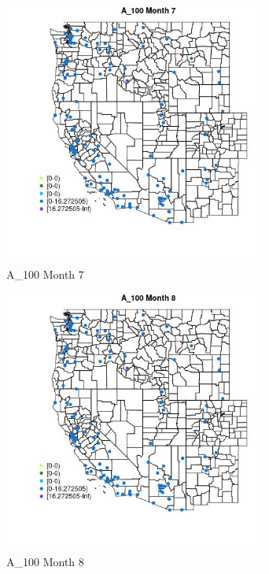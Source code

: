 \begin{figure} 
\centering  
\includegraphics[width=0.77\textwidth]{Code_Outputs/Report_ML_input_PM25_Step4_part_e_de_duplicated_aves_MapObsMo7A_100.jpg} 
\caption{\label{fig:Report_ML_input_PM25_Step4_part_e_de_duplicated_avesMapObsMo7A_100}A_100 Month 7} 
\end{figure} 
 

\clearpage 

\begin{figure} 
\centering  
\includegraphics[width=0.77\textwidth]{Code_Outputs/Report_ML_input_PM25_Step4_part_e_de_duplicated_aves_MapObsMo8A_100.jpg} 
\caption{\label{fig:Report_ML_input_PM25_Step4_part_e_de_duplicated_avesMapObsMo8A_100}A_100 Month 8} 
\end{figure} 
 

